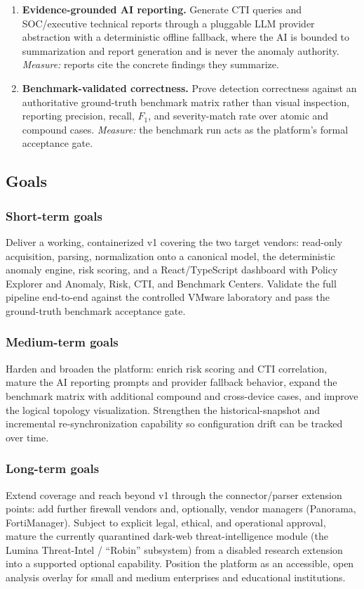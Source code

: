 \begin{enumerate}[leftmargin=1.7em, label=\textbf{O\arabic*.}]
  \item \textbf{Evidence-grounded AI reporting.} Generate CTI queries and SOC/executive technical reports through a pluggable LLM provider abstraction with a deterministic offline fallback, where the AI is bounded to summarization and report generation and is never the anomaly authority. \emph{Measure:} reports cite the concrete findings they summarize.
  \item \textbf{Benchmark-validated correctness.} Prove detection correctness against an authoritative ground-truth benchmark matrix rather than visual inspection, reporting precision, recall, $F_1$, and severity-match rate over atomic and compound cases. \emph{Measure:} the benchmark run acts as the platform's formal acceptance gate.
\end{enumerate}

\subsection{Goals}
\label{sec:ch1-goals}

\subsubsection{Short-term goals}
Deliver a working, containerized v1 covering the two target vendors: read-only acquisition, parsing, normalization onto a canonical model, the deterministic anomaly engine, risk scoring, and a React/TypeScript dashboard with Policy Explorer and Anomaly, Risk, CTI, and Benchmark Centers. Validate the full pipeline end-to-end against the controlled VMware laboratory and pass the ground-truth benchmark acceptance gate.

\subsubsection{Medium-term goals}
Harden and broaden the platform: enrich risk scoring and CTI correlation, mature the AI reporting prompts and provider fallback behavior, expand the benchmark matrix with additional compound and cross-device cases, and improve the logical topology visualization. Strengthen the historical-snapshot and incremental re-synchronization capability so configuration drift can be tracked over time.

\subsubsection{Long-term goals}
Extend coverage and reach beyond v1 through the connector/parser extension points: add further firewall vendors and, optionally, vendor managers (Panorama, FortiManager). Subject to explicit legal, ethical, and operational approval, mature the currently quarantined dark-web threat-intelligence module (the Lumina Threat-Intel / ``Robin'' subsystem) from a disabled research extension into a supported optional capability. Position the platform as an accessible, open analysis overlay for small and medium enterprises and educational institutions.

